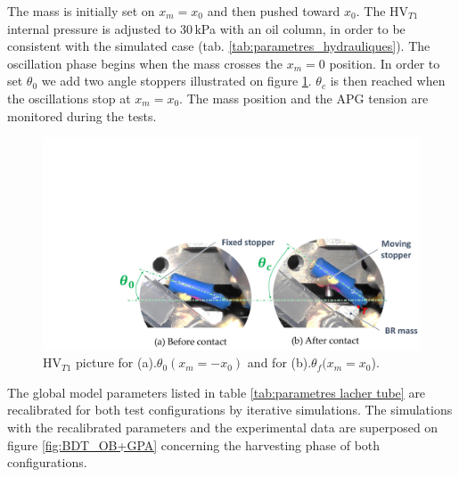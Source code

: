 \documentclass[3p,twocolumn,preprint]{elsarticle}
\begin{document}
The mass is initially set on $x_m=x_0$ and then pushed toward $x_0$. The HV$_{T1}$ internal pressure is adjusted to $30$\,kPa with an oil column, in order to be consistent with the simulated case (tab. \ref{tab:parametres_hydrauliques}). The oscillation phase begins when the mass crosses the $x_m=0$ position. In order to set $\theta_0$ we add two angle stoppers illustrated on figure \ref{fig:contact_M_VH_lachers}. $\theta_c$ is then reached when the oscillations stop at $x_m=x_0$. The mass position and the APG tension are monitored during the tests.
\begin{figure}[!htbp]
	\begin{center}
		\captionsetup{justification=centering}
		\includegraphics[trim={6.9cm 0cm 0cm 9cm},clip,width=0.9\linewidth]{figures/contact_M_VH_lachers.pdf}
		\caption{HV$_{T1}$ picture for (a).$\theta_0(x_m=-x_{0})$ and for (b).$\theta_f(x_m=x_0$).}
		\label{fig:contact_M_VH_lachers}
	\end{center}
\end{figure}

The global model parameters listed in table \ref{tab:parametres lacher tube} are recalibrated for both test configurations by iterative simulations. The simulations with the recalibrated parameters and the experimental data are superposed on figure \ref{fig:BDT_OB+GPA} concerning the harvesting phase of both configurations. 
\end{document}
